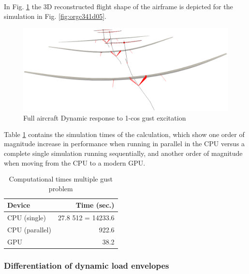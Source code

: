 \documentclass[11pt]{article}
\begin{document}
In Fig. \ref{fig:org712993e} the 3D reconstructed flight shape of the airframe is depicted for the simulation in Fig. \ref{fig:orgc341d05}. 

\begin{figure}[htbp]
\centering
\includegraphics[width=1\textwidth]{figs_ext/Gust3D_3.png}
\caption{\label{fig:org712993e}Full aircraft Dynamic response to 1-cos gust excitation}
\end{figure}

Table \ref{tab:org9cea86c} contains the simulation times of the calculation, which show one order of magnitude increase in performance when running in parallel in the CPU versus a complete single simulation running sequentially, and another order of magnitude when moving from the CPU to a modern GPU.

\begin{table}[htbp]
\caption{\label{tab:org9cea86c}Computational times multiple gust problem}
\centering
\begin{tabular}{lr}
Device & Time (sec.)\\[0pt]
\hline
CPU (single) & 27.8 \texttimes{} 512 = 14233.6\\[0pt]
CPU (parallel) & 922.6\\[0pt]
GPU & 38.2\\[0pt]
\end{tabular}
\end{table}

\subsubsection{Differentiation of dynamic load envelopes}
\label{sec:org19130ec}
\end{document}
